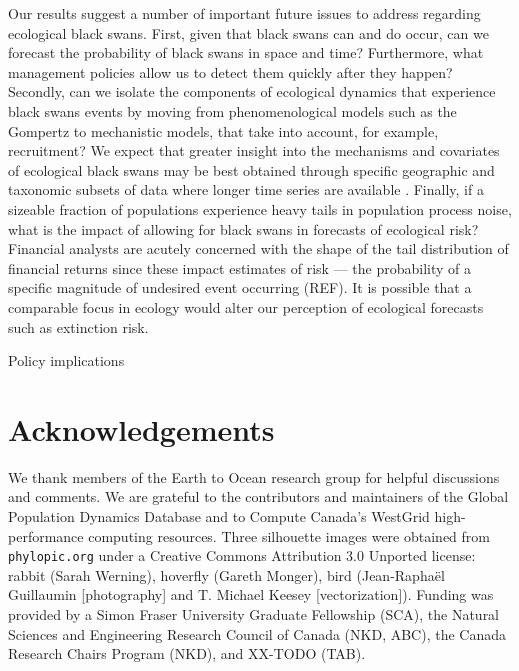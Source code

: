 Our results suggest a number of important future issues to address regarding
ecological black swans. First, given that black swans can and do occur, can we
forecast the probability of black swans in space and time? Furthermore, what
management policies allow us to detect them quickly after they happen?
Secondly, can we isolate the components of ecological dynamics that experience
black swans events by moving from phenomenological models such as the Gompertz
to mechanistic models, that take into account, for example, recruitment? We
expect that greater insight into the mechanisms and covariates of ecological
black swans may be best obtained through specific geographic and taxonomic
subsets of data where longer time series are available
\citep[e.g.][]{segura2013}. Finally, if a sizeable fraction of populations
experience heavy tails in population process noise, what is the impact of
allowing for black swans in forecasts of ecological risk? Financial analysts
are acutely concerned with the shape of the tail distribution of financial
returns since these impact estimates of risk --- the probability of a specific
magnitude of undesired event occurring (REF). It is possible that a comparable
focus in ecology would alter our perception of ecological forecasts such as
extinction risk.

Policy implications

\section{Acknowledgements}

We thank members of the Earth to Ocean research group for helpful discussions
and comments. We are grateful to the contributors and maintainers of the Global
Population Dynamics Database and to Compute Canada's WestGrid high-performance
computing resources. Three silhouette images were obtained from
\texttt{phylopic.org} under a Creative Commons Attribution 3.0 Unported
license: rabbit (Sarah Werning), hoverfly (Gareth Monger), bird (Jean-Raphaël
Guillaumin {[}photography{]} and T. Michael Keesey {[}vectorization{]}).
Funding was provided by a Simon Fraser University Graduate Fellowship (SCA),
the Natural Sciences and Engineering Research Council of Canada (NKD, ABC), the
Canada Research Chairs Program (NKD), and XX-TODO (TAB).




\clearpage

